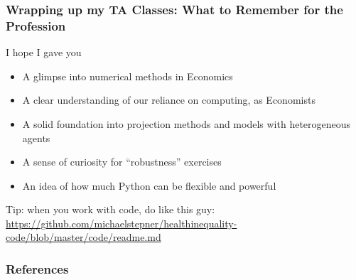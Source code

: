 \documentclass[10pt, aspectratio=1610, natbib, handout]{beamer}
\begin{document}
  \begin{frame}
    \frametitle{Wrapping up my TA Classes: What to Remember for the Profession}

    I hope I gave you

    \vfill\pause

    \begin{itemize}
      \item A glimpse into numerical methods in Economics
      \vfill\pause
      \item A clear understanding of our reliance on computing, as Economists
      \vfill\pause
      \item A solid foundation into projection methods and models with heterogeneous agents
      \vfill\pause
      \item A sense of curiosity for ``robustness'' exercises
      \vfill\pause
      \item An idea of how much Python can be flexible and powerful
    \end{itemize}

    \vfill\pause

    Tip: when you work with code, do like this guy: \url{https://github.com/michaelstepner/healthinequality-code/blob/master/code/readme.md}

  \end{frame}

  \appendix

  \begin{frame}
    \frametitle{References}

    
    

  \end{frame}
\end{document}
